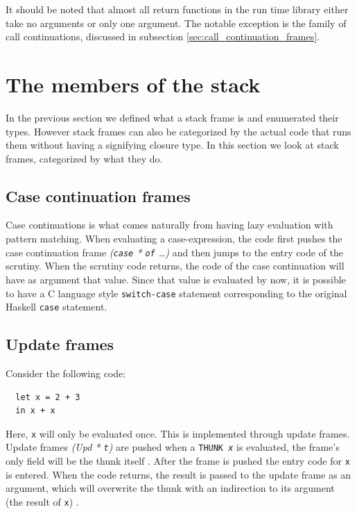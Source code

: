 It should be noted that almost all return functions in the run time library
either take no arguments or only one argument. The notable exception is the
family of call continuations, discussed in subsection \ref{sec:call_continuation_frames}.

\section{The members of the stack}

In the previous section we defined what a stack frame is and enumerated
their types. However stack frames can also be categorized by the actual
code that runs them without having a signifying closure type. In this
section we look at stack frames, categorized by what they do.

\subsection{Case continuation frames}

Case continuations is what comes naturally from having lazy evaluation
with pattern matching. When evaluating a case-expression, the code first
pushes the case continuation frame \emph{(\texttt{case} * \texttt{of}
\dots)} and then jumps to the entry code of the scrutiny. When the
scrutiny code returns, the code of the case continuation will have
as argument that value. Since that value is evaluated by now, it is
possible to have a C language style \texttt{switch-case} statement
corresponding to the original Haskell \texttt{case} statement.

\subsection{Update frames}

Consider the following code:

\begin{verbatim}
  let x = 2 + 3
  in x + x
\end{verbatim}

Here, \texttt{x} will only be evaluated once. This is implemented
through update frames. Update frames \emph{(Upd * \texttt{t})}
are pushed when a \texttt{THUNK \emph{x}} is evaluated, the frame's only
field will be the thunk itself \cite{github_thunk_code}. After the frame is
pushed the entry code for \texttt{x} is entered. When the code returns,
the result is passed to the update frame as an argument, which will
overwrite the thunk with an indirection to its argument (the result of
\texttt{x}) \cite{github_updates_indirection}.


